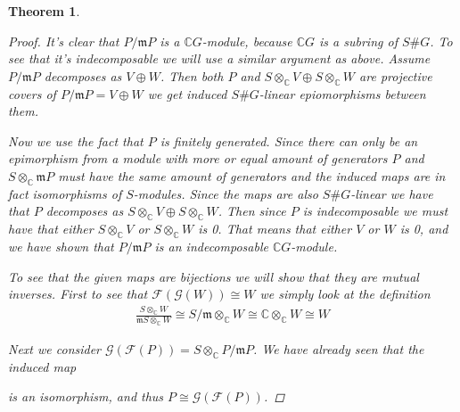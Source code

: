 \documentclass[11pt, a4paper, english]{article}
\numberwithin{prop}{section}
\numberwithin{lemma}{section}
\newtheorem{theorem}{Theorem}
\numberwithin{theorem}{section}
\numberwithin{defin}{section}
\numberwithin{example}{section}
\newcommand{\C}{\mathbb{C}}
\begin{document}
\begin{theorem}
\begin{proof}
It's clear that $P/\mathfrak{m}P$ is a $\C G$-module, because $\C G$ is a subring of $S\#G$. To see that it's indecomposable we will use a similar argument as above. Assume $P/\mathfrak{m}P$ decomposes as $V \oplus W$. Then both $P$ and $S\otimes_\C V \oplus S \otimes_\C W$ are projective covers of $P/\mathfrak{m}P = V\oplus W$ we get induced $S\#G$-linear epiomorphisms between them.

\begin{center}
\end{center}

Now we use the fact that $P$ is finitely generated. Since there can only be an epimorphism from a module with more or equal amount of generators $P$ and $S\otimes_\C \mathfrak{m}P$ must have the same amount of generators and the induced maps are in fact isomorphisms of $S$-modules. Since the maps are also $S\#G$-linear we have that $P$ decomposes as $S\otimes_\C V \oplus S \otimes_\C W$. Then since $P$ is indecomposable we must have that either $S \otimes_\C V$ or $S\otimes_\C W$ is 0. That means that either $V$ or $W$ is 0, and we have shown that $P/\mathfrak{m}P$ is an indecomposable $\C G$-module.

To see that the given maps are bijections we will show that they are mutual inverses. First to see that $\mathcal{F}(\mathcal{G}(W)) \cong W$ we simply look at the definition
\begin{equation*}
\begin{split}
\frac{S \otimes_\C W}{\mathfrak{m}S \otimes_\C W} \cong S/\mathfrak{m} \otimes_\C W \cong \C \otimes_\C W \cong W
\end{split}
\end{equation*}

Next we consider $\mathcal{G}(\mathcal{F}(P)) = S \otimes_\C P/\mathfrak{m}P$. We have already seen that the induced map
\begin{center}
\end{center}
is an isomorphism, and thus $P \cong \mathcal{G}(\mathcal{F}(P))$.
\end{proof}


\end{theorem}
\end{document}
